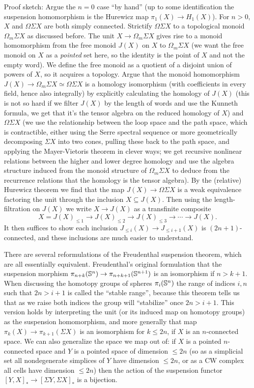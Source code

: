 Proof sketch: Argue the \(n = 0\) case ``by hand'' (up to some identification the suspension homomorphism is the Hurewicz map \(\pi_1(X) \to H_1(X)\)). For \(n > 0\), \(X\) and \(\Omega \Sigma X\) are both simply connected. Strictify \(\Omega \Sigma X\) to a topological monoid \(\Omega_m \Sigma X\) as discussed before. The unit \(X \to \Omega_m \Sigma X\) gives rise to a monoid homomorphism from the free monoid \(J(X)\) on \(X\) to \(\Omega_m \Sigma X\) (we want the free monoid on \(X\) as a \emph{pointed} set here, so the identity is the point of \(X\) and not the empty word). We define the free monoid as a quotient of a disjoint union of powers of \(X\), so it acquires a topology. Argue that the monoid homomorphism \(J(X) \to \Omega_m \Sigma X \simeq \Omega \Sigma X\) is a homology isomorphism (with coefficients in every field, hence also integrally) by explicitly calculating the homology of \(J(X)\) (this is not so hard if we filter \(J(X)\) by the length of words and use the Kunneth formula, we get that it's the tensor algebra on the reduced homology of \(X\)) and \(\Omega\Sigma X\) (we use the relationship between the loop space and the path space, which is contractible, either using the Serre spectral sequence or more geometrically decomposing \(\Sigma X\) into two cones, pulling these back to the path space, and applying the Mayer-Vietoris theorem in clever ways; we get recursive nonlinear relations between the higher and lower degree homology and use the algebra structure induced from the monoid structure of \(\Omega_m \Sigma X\) to deduce from the recurrence relations that the homology is the tensor algebra). By the (relative) Hurewicz theorem we find that the map \(J(X) \to \Omega \Sigma X\) is a weak equivalence factoring the unit through the inclusion \(X \subseteq J(X)\). Then using the length-filtration on \(J(X)\) we write \(X \to J(X)\) as a transfinite composite \[X = J(X)_{\leq 1} \to J(X)_{\leq 2} \to J(X)_{\leq 3} \to \cdots \to J(X).\]It then suffices to show each inclusion \(J_{\leq i}(X) \to J_{\leq i+1}(X)\) is \((2n+1)\)-connected, and these inclusions are much easier to understand.

There are several reformulations of the Freudenthal suspension theorem, which are all essentially equivalent. Freudenthal's original formulation that the suspension morphism \(\pi_{n+k}(\S^n) \to \pi_{n+k+1}(\S^{n+1})\) is an isomorphism if \(n > k + 1\). When discussing the homotopy groups of spheres \(\pi_i(\S^n)\) the range of indices \(i, n\) such that \(2n > i + 1\) is called the ``stable range'', because this theorem tells us that as we raise both indices the group will ``stabilize'' once \(2n > i + 1\). This version holds by interpreting the unit (or its induced map on homotopy groups) as the suspension homomorphism, and more generally that map \(\pi_k(X) \to \pi_{k + 1}(\Sigma X)\) is an isomorphism for \(k \leq 2n\), if \(X\) is an \(n\)-connected space. We can also generalize the space we map out of: if \(X\) is a pointed \(n\)-connected space and \(Y\) is a pointed space of dimension \(\leq 2n\) (so as a simplicial set all nondegenerate simplices of \(Y\) have dimension \(\leq 2n\), or as a CW complex all cells have dimension \(\leq 2n\)) then the action of the suspension functor \([Y, X]_* \to [\Sigma Y, \Sigma X]_*\) is a bijection.

